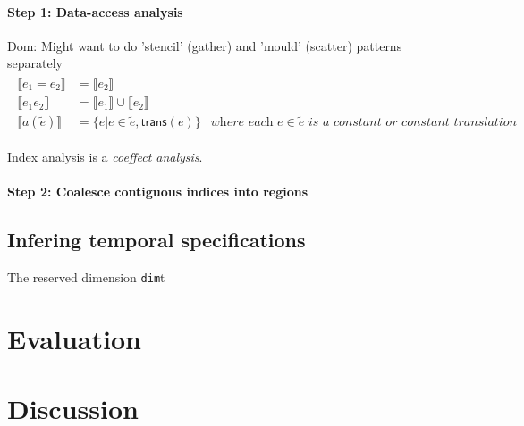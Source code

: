 \documentclass[10pt]{sigplanconf}
\newcommand{\dnote}[1]{\textcolor{darkpurple}{Dom: #1}}
\theoremstyle{definition}
\newcommand{\dimId}{\texttt{dim}}
\newcommand{\interp}[1]{\llbracket{#1}\rrbracket}
\begin{document}
\paragraph{Step 1: Data-access analysis}

\dnote{Might want to do 'stencil' (gather) and 'mould' (scatter)
  patterns separately}
\begin{align*}
\begin{array}{lll}
\interp{e_1 = e_2}    & = \interp{e_2} \\
\interp{e_1 e_2}      & = \interp{e_1} \cup \interp{e_2} \\
\interp{a(\tilde{e})} & = \{e | e \in \tilde{e}, \textsf{trans}(e)\} & \textit{where each $e \in
                                          \tilde{e}$ is a constant or constant translation}
\end{array}
\end{align*}

Index analysis is a \emph{coeffect analysis}.

\paragraph{Step 2: Coalesce contiguous indices into regions}


\subsection{Infering temporal specifications}

The reserved dimension \dimId{t}

\section{Evaluation}

\section{Discussion}



\end{document}
